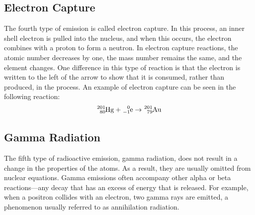 \subsection{Electron Capture}
The fourth type of emission is called electron capture. In this process, an inner shell electron 
is pulled into the nucleus, and when this occurs, the electron combines with a proton to form a 
neutron. In electron capture reactions, the atomic number decreases by one, the mass number 
remains the same, and the element changes. One difference in this type of reaction is that the 
electron is written to the left of the arrow to show that it is consumed, rather than produced, 
in the process. An example of electron capture can be seen in the following reaction:
\[
    \ch{^{201}_{80}Hg}+\ch{^{0}_{-1}e}\to \ch{^{201}_{79}Au}
\]

\subsection{Gamma Radiation}
The fifth type of radioactive emission, gamma radiation, does not result in a change in the 
properties of the atoms. As a result, they are usually omitted from nuclear equations. Gamma 
emissions often accompany other alpha or beta reactions—any decay that has an excess of energy 
that is released. For example, when a positron collides with an electron, two gamma rays are 
emitted, a phenomenon usually referred to as annihilation radiation.

